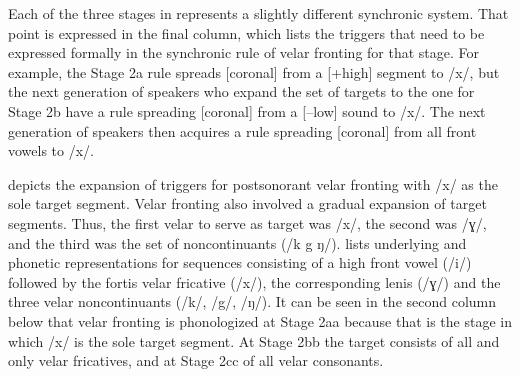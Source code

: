 \begin{table}
\caption{Change from Stage 2a to Stage 2b to Stage 2c'\label{tab:16:3}}
\end{table}

Each of the three stages in  represents a slightly different synchronic system. That point is expressed in the final column, which lists the triggers that need to be expressed formally in the synchronic rule of velar fronting for that stage. For example, the Stage 2a rule spreads [coronal] from a [+high] segment to /x/, but the next generation of speakers who expand the set of targets to the one for Stage 2b have a rule spreading [coronal] from a [--low] sound to /x/. The next generation of speakers then acquires a rule spreading [coronal] from all front vowels to /x/.

 depicts the expansion of triggers for postsonorant velar fronting with /x/ as the sole target segment. Velar fronting also involved a gradual expansion of target segments. Thus, the first velar to serve as target was /x/, the second was /ɣ/, and the third was the set of noncontinuants (/k g ŋ/).  lists underlying and phonetic representations for sequences consisting of a high front vowel (/i/) followed by the fortis velar fricative (/x/), the corresponding lenis (/ɣ/) and the three velar noncontinuants (/k/, /g/, /ŋ/). It can be seen in the second column below that velar fronting is phonologized at Stage 2aa because that is the stage in which /x/ is the sole target segment. At Stage 2bb the target consists of all and only velar fricatives, and at Stage 2cc of all velar consonants.

\begin{table}
\caption{Change from Stage 2aa to Stage 2bb to Stage 2cc\label{tab:16:4}}
\end{table}

